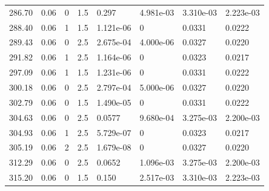 \documentclass[preview]{standalone}
\begin{document}
{{{\begin{tabular}{L{1.2cm}C{1.2cm} C{0.3cm}C{0.5cm} C{1.4cm}C{1.4cm} C{1.4cm}C{1.4cm}}
  286.70  &  0.06  & 0     & 1.5 &  0.297  & 4.981e-03  & 3.310e-03 &  2.223e-03   \\ 
  288.40  &  0.06  & 1     & 1.5 &  1.121e-06  & 0  & 0.0331 &  0.0222   \\ 
  289.43  &  0.06  & 0     & 2.5 &  2.675e-04  & 4.000e-06  & 0.0327 &  0.0220   \\ 
  291.82  &  0.06  & 1     & 2.5 &  1.164e-06  & 0  & 0.0323 &  0.0217   \\ 
  297.09  &  0.06  & 1     & 1.5 &  1.231e-06  & 0  & 0.0331 &  0.0222   \\ 
  300.18  &  0.06  & 0     & 2.5 &  2.797e-04  & 5.000e-06  & 0.0327 &  0.0220   \\ 
  302.79  &  0.06  & 0     & 1.5 &  1.490e-05  & 0  & 0.0331 &  0.0222   \\ 
  304.63  &  0.06  & 0     & 2.5 &  0.0577  & 9.680e-04  & 3.275e-03 &  2.200e-03   \\ 
  304.93  &  0.06  & 1     & 2.5 &  5.729e-07  & 0  & 0.0323 &  0.0217   \\ 
  305.19  &  0.06  & 2     & 2.5 &  1.679e-08  & 0  & 0.0327 &  0.0220   \\ 
  312.29  &  0.06  & 0     & 2.5 &  0.0652  & 1.096e-03  & 3.275e-03 &  2.200e-03   \\ 
  315.20  &  0.06  & 0     & 1.5 &  0.150  & 2.517e-03  & 3.310e-03 &  2.223e-03   \\ 
\hline 
\end{tabular} 

}}}
\end{document}
